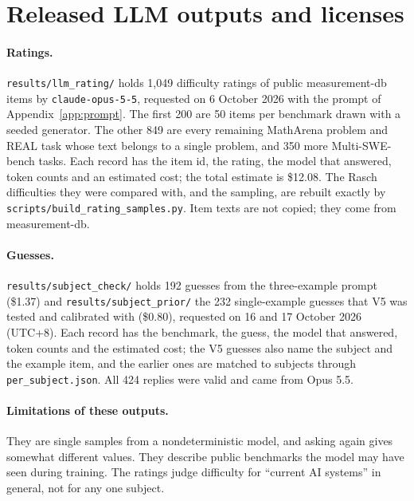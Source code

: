 \section{Released LLM outputs and licenses}\label{app:datacard}

\paragraph{Ratings.} \texttt{results/llm\_rating/} holds 1,049 difficulty ratings of public measurement-db items by \texttt{claude-opus-5-5}, requested on 6 October 2026 with the prompt of Appendix~\ref{app:prompt}. The first 200 are 50 items per benchmark drawn with a seeded generator. The other 849 are every remaining MathArena problem and REAL task whose text belongs to a single problem, and 350 more Multi-SWE-bench tasks. Each record has the item id, the rating, the model that answered, token counts and an estimated cost; the total estimate is \$12.08. The Rasch difficulties they were compared with, and the sampling, are rebuilt exactly by \texttt{scripts/build\_rating\_samples.py}. Item texts are not copied; they come from measurement-db.

\paragraph{Guesses.} \texttt{results/subject\_check/} holds 192 guesses from the three-example prompt (\$1.37) and \texttt{results/subject\_prior/} the 232 single-example guesses that V5 was tested and calibrated with (\$0.80), requested on 16 and 17 October 2026 (UTC+8). Each record has the benchmark, the guess, the model that answered, token counts and the estimated cost; the V5 guesses also name the subject and the example item, and the earlier ones are matched to subjects through \texttt{per\_subject.json}. All 424 replies were valid and came from Opus 5.5.

\paragraph{Limitations of these outputs.} They are single samples from a nondeterministic model, and asking again gives somewhat different values. They describe public benchmarks the model may have seen during training. The ratings judge difficulty for ``current AI systems'' in general, not for any one subject.

